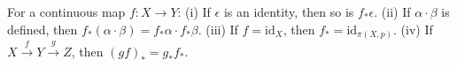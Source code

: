 For a continuous map $f: X \to Y$:
(i) If $\epsilon$ is an identity, then so is $f_*\epsilon$.
(ii) If $\alpha \cdot \beta$ is defined, then $f_*(\alpha \cdot \beta) = f_*\alpha \cdot f_*\beta$.
(iii) If $f = \mathrm{id}_X$, then $f_* = \mathrm{id}_{\pi(X,p)}$.
(iv) If $X \xrightarrow{f} Y \xrightarrow{g} Z$, then $(gf)_* = g_* f_*$.
